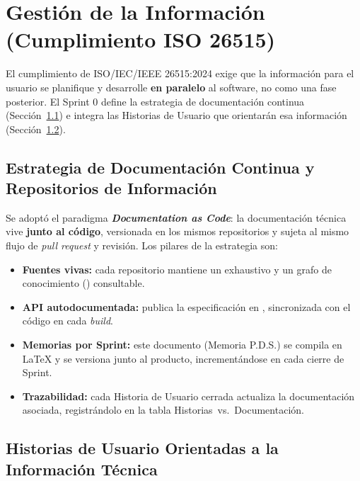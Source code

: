 \section{Gestión de la Información (Cumplimiento ISO 26515)}
\label{sec:s0_gestion_info}

El cumplimiento de ISO/IEC/IEEE 26515:2024 exige que la información para el usuario se planifique
y desarrolle \textbf{en paralelo} al software, no como una fase posterior. El Sprint 0 define la
estrategia de documentación continua (Sección~\ref{ssec:s0_estrategia_doc}) e integra las
Historias de Usuario que orientarán esa información (Sección~\ref{ssec:s0_backlog}).\par

\subsection{Estrategia de Documentación Continua y Repositorios de Información}
\label{ssec:s0_estrategia_doc}

Se adoptó el paradigma \textbf{\textit{Documentation as Code}}: la documentación técnica vive
\textbf{junto al código}, versionada en los mismos repositorios y sujeta al mismo flujo de
\textit{pull request} y revisión. Los pilares de la estrategia son:

\begin{itemize}[noitemsep]
    \item \textbf{Fuentes vivas:} cada repositorio mantiene un  exhaustivo y
    un grafo de conocimiento () consultable.
    \item \textbf{API autodocumentada:}  publica la especificación en
    , sincronizada con el código en cada \textit{build}.
    \item \textbf{Memorias por Sprint:} este documento (Memoria P.D.S.) se compila en LaTeX y se
    versiona junto al producto, incrementándose en cada cierre de Sprint.
    \item \textbf{Trazabilidad:} cada Historia de Usuario cerrada actualiza la documentación
    asociada, registrándolo en la tabla Historias~vs.~Documentación.
\end{itemize}

\subsection{Historias de Usuario Orientadas a la Información Técnica}
\label{ssec:s0_backlog}

